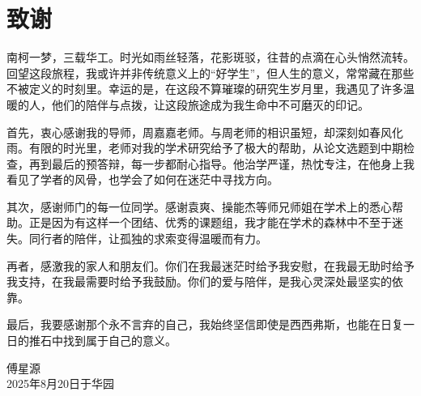 \chapter{致\texorpdfstring{\quad}{}谢}
南柯一梦，三载华工。时光如雨丝轻落，花影斑驳，往昔的点滴在心头悄然流转。回望这段旅程，我或许并非传统意义上的“好学生”，但人生的意义，常常藏在那些不被定义的时刻里。幸运的是，在这段不算璀璨的研究生岁月里，我遇见了许多温暖的人，他们的陪伴与点拨，让这段旅途成为我生命中不可磨灭的印记。

首先，衷心感谢我的导师，周嘉嘉老师。与周老师的相识虽短，却深刻如春风化雨。有限的时光里，老师对我的学术研究给予了极大的帮助，从论文选题到中期检查，再到最后的预答辩，每一步都耐心指导。他治学严谨，热忱专注，在他身上我看见了学者的风骨，也学会了如何在迷茫中寻找方向。

其次，感谢师门的每一位同学。感谢袁爽、操能杰等师兄师姐在学术上的悉心帮助。正是因为有这样一个团结、优秀的课题组，我才能在学术的森林中不至于迷失。同行者的陪伴，让孤独的求索变得温暖而有力。

再者，感激我的家人和朋友们。你们在我最迷茫时给予我安慰，在我最无助时给予我支持，在我最需要时给予我鼓励。你们的爱与陪伴，是我心灵深处最坚实的依靠。

最后，我要感谢那个永不言弃的自己，我始终坚信即使是西西弗斯，也能在日复一日的推石中找到属于自己的意义。
\begin{flushright}
  傅星源\\
  2025年8月20日于华园
\end{flushright}

